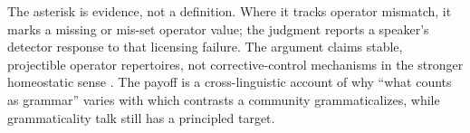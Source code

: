 \documentclass[12pt,letterpaper]{article}
\begin{document}
The asterisk is evidence, not a definition. Where it tracks operator mismatch, it marks a missing or mis-set operator value; the judgment reports a speaker's detector response to that licensing failure. The argument claims stable, projectible operator repertoires, not corrective-control mechanisms in the stronger homeostatic sense \citep{weinberger2026HomeostasisCausalControl,author2026notEveryStableCluster}. The payoff is a cross-linguistic account of why \enquote{what counts as grammar} varies with which contrasts a community grammaticalizes, while grammaticality talk still has a principled target.

\clearpage
\printbibliography
\end{document}
